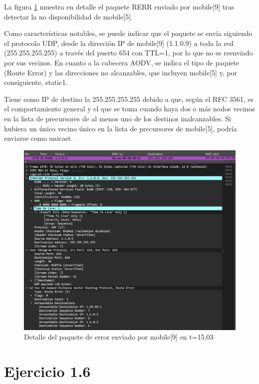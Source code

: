 La figura \ref{fig:RerrWireshark} muestra en detalle el paquete RERR enviado por mobile[9] tras detectar la no disponibilidad de mobile[5]. 

Como características notables, se puede indicar que el paquete se envía siguiendo el protocolo UDP, desde la dirección IP de mobile[9] (1.1.0.9) a toda la red (255.255.255.255) a través del puerto 654 con TTL=1, por lo que no es reenviado por sus vecinos. En cuanto a la cabecera AODV, se indica el tipo de paquete (Route Error) y las direcciones no alcanzables, que incluyen mobile[5] y, por consiguiente, static1.

Tiene como IP de destino la 255.255.255.255 debido a que, según el RFC 3561, es el comportamiento general y el que se toma cuando haya dos o más nodos vecinos en la lista de precursores de al menos uno de los destinos inalcanzables. Si hubiera un único vecino único en la lista de precursores de mobile[5], podría enviarse como unicast.

\begin{figure}[H]
    \centering
    \includegraphics[width=125mm, scale=0.75]{imaxes/ejercicio5_1.png}
    \caption{Detalle del paquete de error enviado por mobile[9] en t=15,03}
    \label{fig:RerrWireshark}
\end{figure}

\vspace{1.25cm}
\section{Ejercicio 1.6}


